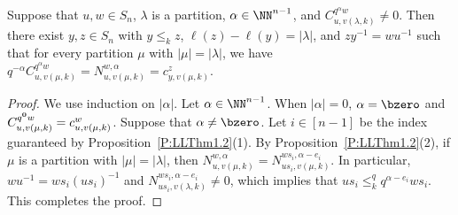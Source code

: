 \begin{lemma} \label{L:Quantum_is_Classical}
  Suppose that $u,w\in S_n$, $\lambda$ is a partition, $\alpha\in\NN^{n-1}$, and $C^{q^\alpha w}_{u,v(\lambda,k)}\neq 0$.
  Then there exist $y,z\in S_n$ with $y\leq_k z$, $\ell(z)-\ell(y)=|\lambda|$, and $zy^{-1}=wu^{-1}$
  such that for every partition $\mu$ with $|\mu|=|\lambda|$, we have
  $q^{-\alpha}C^{q^\alpha w}_{u,v(\mu,k)}=N^{w,\alpha}_{u,v(\mu,k)}=c^{z}_{y,v(\mu,k)}$. 
\end{lemma}

\begin{proof}
  We use induction on $|\alpha|$.
  Let $\alpha\in\NN^{n-1}$.
  When $|\alpha|=0$, $\alpha={\bzero}$ and $C^{q^{\bf 0}w}_{u,v(\mu,k)}=c^w_{u,v(\mu,k)}$.
  Suppose that $\alpha\neq\bzero$.
  Let $i\in[n{-}1]$ be the index guaranteed by Proposition~\ref{P:LLThm1.2}(1).
  By Proposition~\ref{P:LLThm1.2}(2), if $\mu$ is a partition with $|\mu|=|\lambda|$, then 
  $N^{w,\alpha}_{u,v(\mu,k)}=N^{ws_i, \alpha-e_i}_{us_i,v(\mu,k)}$.
  In particular,   $wu^{-1}=ws_i(u s_i)^{-1}$  and $N^{ws_i, \alpha-e_i}_{us_i,v(\lambda,k)}\neq 0$, which implies that
  $us_i\leq_k^q q^{\alpha-e_i}w s_i$.
  This completes the proof.
\end{proof}

